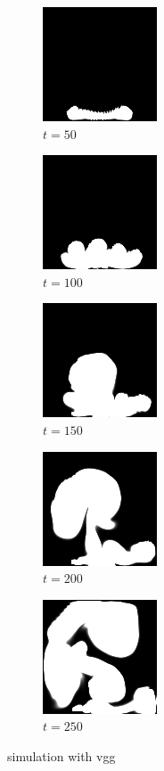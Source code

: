 \documentclass[a4paper,12pt,twoside]{report}
\begin{document}
\begin{figure}
\centering
\begin{subfigure}{0.18\textwidth}
  \centering
  \includegraphics[scale=0.56]{buoyancy_test/dens_000050_vgg.png}
  \caption{$t=50$}
\end{subfigure}
\begin{subfigure}{0.18\textwidth}
  \centering
  \includegraphics[scale=0.56]{buoyancy_test/dens_000100_vgg.png}
  \caption{$t=100$}
\end{subfigure}
\begin{subfigure}{0.18\textwidth}
  \centering
  \includegraphics[scale=0.56]{buoyancy_test/dens_000150_vgg.png}
  \caption{$t=150$}
\end{subfigure}
\begin{subfigure}{0.18\textwidth}
  \centering
  \includegraphics[scale=0.56]{buoyancy_test/dens_000200_vgg.png}
  \caption{$t=200$}
\end{subfigure}
\begin{subfigure}{0.18\textwidth}
  \centering
  \includegraphics[scale=0.56]{buoyancy_test/dens_000249_vgg.png}
  \caption{$t=250$}
\end{subfigure}
\caption{simulation with vgg}
\label{sol buoyancy high vgg}
\end{figure}
\end{document}

